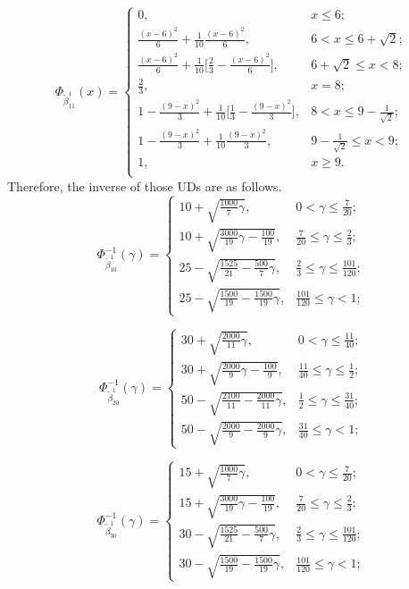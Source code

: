 \[\Phi_{\tilde{\beta}_{11}^1}(x)=\left\{
\begin{array}{ll}
	0, & x\leq 6;\\
	\frac{(x-6)^2}{6}+\frac{1}{10}\frac{(x-6)^2}{6}, & 6<x\leq 6+\sqrt{2};\\
	\frac{(x-6)^2}{6}+\frac{1}{10}\big[\frac{2}{3}-\frac{(x-6)^2}{6}\big], & 6+\sqrt{2}\leq x<8;\\
	\frac{2}{3}, & x=8;\\
	1-\frac{(9-x)^2}{3}+\frac{1}{10}\big[\frac{1}{3}-\frac{(9-x)^2}{3}\big], & 8<x\leq 9-\frac{1}{\sqrt{2}};\\
	1-\frac{(9-x)^2}{3}+\frac{1}{10}\frac{(9-x)^2}{3}, &  9-\frac{1}{\sqrt{2}}\leq x<9;\\
	1, & x\geq 9.\\
\end{array}
\right.
\]   
Therefore, the inverse of those UDs are as follows.
\[\Phi_{\tilde{\beta}_{10}^1}^{-1}(\gamma)=\left\{
\begin{array}{ll}
	10+\sqrt{\frac{1000}{7}\gamma}, & 0<\gamma\leq \frac{7}{20};\\
	10+\sqrt{\frac{3000}{19}\gamma-\frac{100}{19}}, & \frac{7}{20}\leq\gamma\leq \frac{2}{3};\\
	25-\sqrt{\frac{1525}{21}-\frac{500}{7}\gamma}, & \frac{2}{3}\leq\gamma\leq \frac{101}{120};\\
	25-\sqrt{\frac{1500}{19}-\frac{1500}{19}\gamma}, & \frac{101}{120}\leq\gamma<1;
\end{array}
\right.
\]

\[\Phi_{\tilde{\beta}_{20}^1}^{-1}(\gamma)=\left\{
\begin{array}{ll}
	30+\sqrt{\frac{2000}{11}\gamma}, & 0<\gamma\leq \frac{11}{40};\\
	30+\sqrt{\frac{2000}{9}\gamma-\frac{100}{9}}, & \frac{11}{40}\leq\gamma\leq \frac{1}{2};\\
	50-\sqrt{\frac{2100}{11}-\frac{2000}{11}\gamma}, & \frac{1}{2}\leq\gamma\leq \frac{31}{40};\\
	50-\sqrt{\frac{2000}{9}-\frac{2000}{9}\gamma}, & \frac{31}{40}\leq\gamma<1;
\end{array}
\right.
\]

\[\Phi_{\tilde{\beta}_{30}^1}^{-1}(\gamma)=\left\{
\begin{array}{ll}
	15+\sqrt{\frac{1000}{7}\gamma}, & 0<\gamma\leq \frac{7}{20};\\
	15+\sqrt{\frac{3000}{19}\gamma-\frac{100}{19}}, & \frac{7}{20}\leq\gamma\leq \frac{2}{3};\\
	30-\sqrt{\frac{1525}{21}-\frac{500}{7}\gamma}, & \frac{2}{3}\leq\gamma\leq \frac{101}{120};\\
	30-\sqrt{\frac{1500}{19}-\frac{1500}{19}\gamma}, & \frac{101}{120}\leq\gamma<1;
\end{array}
\right.
\]

